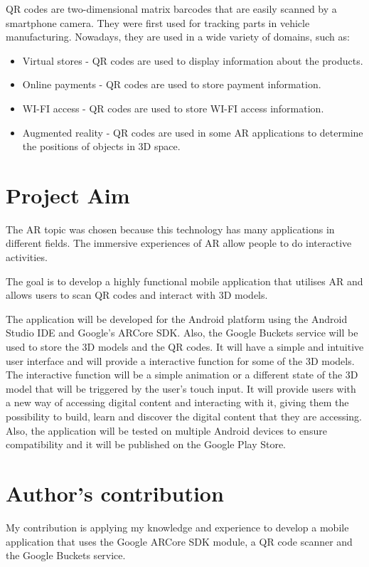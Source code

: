 \ac{QR} codes are two-dimensional matrix barcodes that are easily scanned by a smartphone camera. They were first used for tracking parts in vehicle manufacturing. Nowadays, they are used in a wide variety of domains, such as:
\begin{itemize}
    \item Virtual stores - \ac{QR} codes are used to display information about the products.
    \item Online payments - \ac{QR} codes are used to store payment information.
    \item WI-FI access - \ac{QR} codes are used to store WI-FI access information.
    \item Augmented reality - \ac{QR} codes are used in some \ac{AR} applications to determine the positions of objects in \ac{3D} space.
\end{itemize}


\section{Project Aim}
The AR topic was chosen because this technology has many applications in different fields. The immersive experiences of \ac{AR} allow people to do interactive activities.

The goal is to develop a highly functional mobile application that utilises \ac{AR} and allows users to scan \ac{QR} codes and interact with \ac{3D} models.

The application will be developed for the Android platform using the Android Studio IDE and Google's ARCore SDK. Also, the Google Buckets service will be used to store the \ac{3D} models and the \ac{QR} codes. It will have a simple and intuitive user interface and will provide a interactive function for some of the \ac{3D} models. The interactive function will be a simple animation or a different state of the \ac{3D} model that will be triggered by the user's touch input. It will provide users with a new way of accessing digital content and interacting with it, giving them the possibility to build, learn and discover the digital content that they are accessing. Also, the application will be tested on multiple Android devices to ensure compatibility and it will be published on the Google Play Store.


\section{Author's contribution}
My contribution is applying my knowledge and experience to develop a mobile application that uses the Google ARCore SDK module, a \ac{QR} code scanner and the Google Buckets service.


